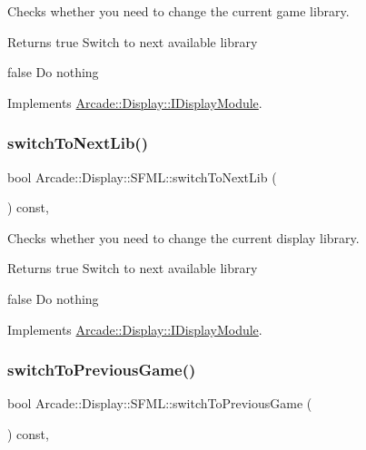 Checks whether you need to change the current game library. 

\begin{DoxyReturn}{Returns}
true Switch to next available library 

false Do nothing 
\end{DoxyReturn}


Implements \mbox{\hyperlink{classArcade_1_1Display_1_1IDisplayModule_a9584cb0ca3b157c9a4ec94509e4f8e32}{Arcade\+::\+Display\+::\+I\+Display\+Module}}.

\mbox{\label{classArcade_1_1Display_1_1SFML_a3e7d385aaa46e9137f41e4d78d5e233c}} 
\subsubsection{\texorpdfstring{switchToNextLib()}{switchToNextLib()}}
{\footnotesize\ttfamily bool Arcade\+::\+Display\+::\+S\+F\+M\+L\+::switch\+To\+Next\+Lib (\begin{DoxyParamCaption}{ }\end{DoxyParamCaption}) const\hspace{0.3cm}{\ttfamily [final]}, {\ttfamily [virtual]}}



Checks whether you need to change the current display library. 

\begin{DoxyReturn}{Returns}
true Switch to next available library 

false Do nothing 
\end{DoxyReturn}


Implements \mbox{\hyperlink{classArcade_1_1Display_1_1IDisplayModule_a0de47361c9d47bf8fc52070b945f23b7}{Arcade\+::\+Display\+::\+I\+Display\+Module}}.

\mbox{\label{classArcade_1_1Display_1_1SFML_ae5dbff9dd547fb0a09e478e11bf74c11}} 
\subsubsection{\texorpdfstring{switchToPreviousGame()}{switchToPreviousGame()}}
{\footnotesize\ttfamily bool Arcade\+::\+Display\+::\+S\+F\+M\+L\+::switch\+To\+Previous\+Game (\begin{DoxyParamCaption}{ }\end{DoxyParamCaption}) const\hspace{0.3cm}{\ttfamily [final]}, {\ttfamily [virtual]}}



